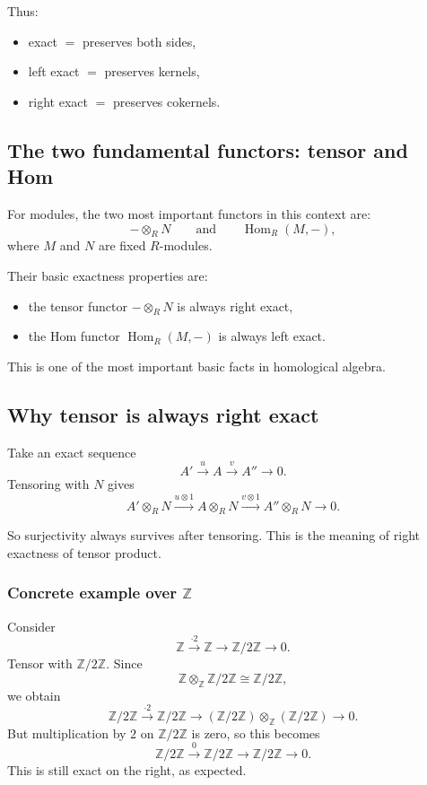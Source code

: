 \documentclass[12pt,a4paper]{article}
\theoremstyle{notespace}
\theoremstyle{definition}
\begin{document}
Thus:
\begin{itemize}
	\item exact \(=\) preserves both sides,
	\item left exact \(=\) preserves kernels,
	\item right exact \(=\) preserves cokernels.
\end{itemize}

\subsection{ The two fundamental functors: tensor and Hom}

For modules, the two most important functors in this context are:
\[
-\otimes_R N
\qquad\text{and}\qquad
\operatorname{Hom}_R(M,-),
\]
where \(M\) and \(N\) are fixed \(R\)-modules.

Their basic exactness properties are:

\begin{itemize}
	\item the tensor functor \( -\otimes_R N \) is always right exact,
	\item the Hom functor \( \operatorname{Hom}_R(M,-) \) is always left exact.
\end{itemize}

This is one of the most important basic facts in homological algebra.

\subsection{ Why tensor is always right exact}

Take an exact sequence
\[
A' \xrightarrow{u} A \xrightarrow{v} A'' \longrightarrow 0.
\]
Tensoring with \(N\) gives
\[
A'\otimes_R N \xrightarrow{u\otimes 1} A\otimes_R N \xrightarrow{v\otimes 1} A''\otimes_R N \longrightarrow 0.
\]

So surjectivity always survives after tensoring.
This is the meaning of right exactness of tensor product.

\subsubsection*{Concrete example over \(\mathbb Z\)}

Consider
\[
\mathbb Z \xrightarrow{\cdot 2} \mathbb Z \longrightarrow \mathbb Z/2\mathbb Z \longrightarrow 0.
\]
Tensor with \(\mathbb Z/2\mathbb Z\).
Since
\[
\mathbb Z\otimes_{\mathbb Z}\mathbb Z/2\mathbb Z \cong \mathbb Z/2\mathbb Z,
\]
we obtain
\[
\mathbb Z/2\mathbb Z \xrightarrow{\cdot 2} \mathbb Z/2\mathbb Z
\longrightarrow
(\mathbb Z/2\mathbb Z)\otimes_{\mathbb Z}(\mathbb Z/2\mathbb Z)
\longrightarrow 0.
\]
But multiplication by \(2\) on \(\mathbb Z/2\mathbb Z\) is zero, so this becomes
\[
\mathbb Z/2\mathbb Z \xrightarrow{0} \mathbb Z/2\mathbb Z \longrightarrow \mathbb Z/2\mathbb Z \longrightarrow 0.
\]
This is still exact on the right, as expected.
\end{document}
